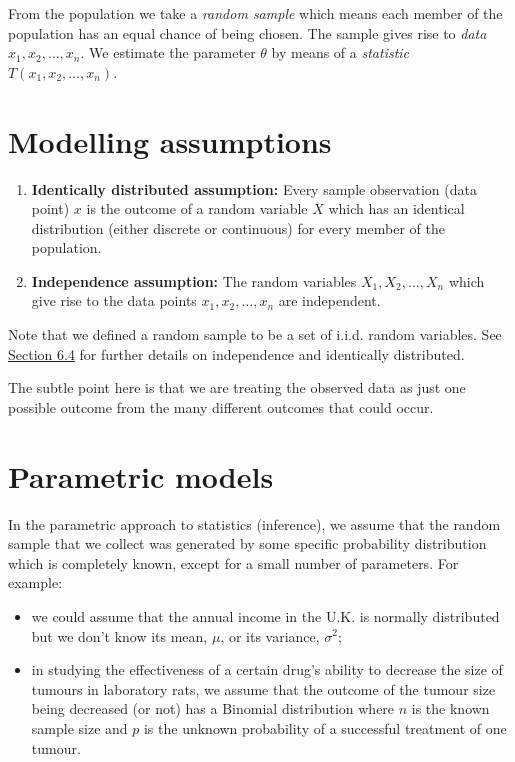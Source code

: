 \documentclass[
]{book}
\providecommand{\tightlist}{%
  \setlength{\itemsep}{0pt}\setlength{\parskip}{0pt}}
\begin{document}
From the population we take a \emph{random sample} which means each member of the population has an equal chance of being chosen. The sample gives rise to \emph{data} \(x_1, x_2, \ldots, x_n\). We estimate the parameter \(\theta\) by means of a \emph{statistic} \(T(x_1, x_2, \ldots, x_n)\).

\hypertarget{motivate:assumption}{%
\section{Modelling assumptions}\label{motivate:assumption}}

\begin{enumerate}
\def\labelenumi{\arabic{enumi}.}
\item
  \textbf{Identically distributed assumption:} Every sample observation (data point) \(x\) is the outcome of a random variable \(X\) which has an identical distribution (either discrete or continuous) for every member of the population.
\item
  \textbf{Independence assumption:} The random variables \(X_1, X_2, \ldots, X_n\) which give rise to the data points \(x_1, x_2, \ldots, x_n\) are independent.
\end{enumerate}

Note that we defined a random sample to be a set of i.i.d. random variables. See \protect\hyperlink{jointdis:independent}{Section 6.4} for further details on independence and identically distributed.

The subtle point here is that we are treating the observed data as just one possible outcome from the many different outcomes that could occur.

\hypertarget{motivate:parametric}{%
\section{Parametric models}\label{motivate:parametric}}

In the parametric approach to statistics (inference), we assume that the random sample that we collect was generated by some specific probability distribution which is completely known, except for a small number of parameters. For example:

\begin{itemize}
\tightlist
\item
  we could assume that the annual income in the U.K. is normally distributed but we don't know its mean, \(\mu\), or its variance, \(\sigma^2\);\\
\item
  in studying the effectiveness of a certain drug's ability to decrease the size of tumours in laboratory rats, we assume that the outcome of the tumour size being decreased (or not) has a Binomial distribution where \(n\) is the known sample size and \(p\) is the unknown probability of a successful treatment of one tumour.
\end{itemize}
\end{document}
